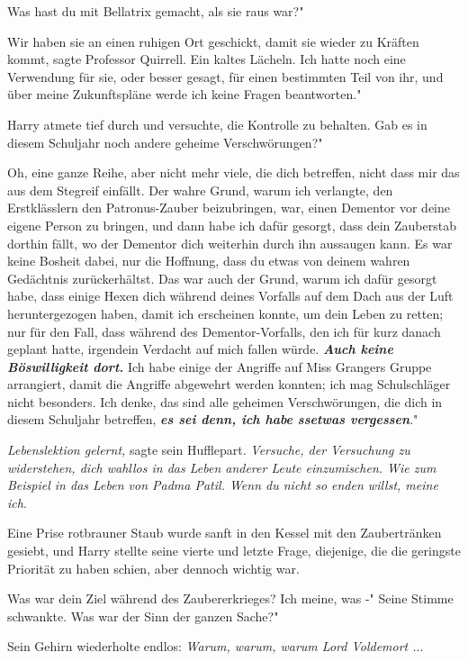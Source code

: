 \glqq Was hast du mit Bellatrix gemacht, als sie raus war?"

\glqq Wir haben sie an einen ruhigen Ort geschickt, damit sie wieder zu Kräften
kommt\grqq{}, sagte Professor Quirrell. Ein kaltes Lächeln. \glqq Ich hatte noch
eine Verwendung für sie, oder besser gesagt, für einen bestimmten Teil von ihr,
und über meine Zukunftspläne werde ich keine Fragen beantworten."

Harry atmete tief durch und versuchte, die Kontrolle zu behalten. \glqq Gab es
in diesem Schuljahr noch andere geheime Verschwörungen?"

\glqq Oh, eine ganze Reihe, aber nicht mehr viele, die dich betreffen, nicht
dass mir das aus dem Stegreif einfällt. Der wahre Grund, warum ich verlangte,
den Erstklässlern den Patronus-Zauber beizubringen, war, einen Dementor vor
deine eigene Person zu bringen, und dann habe ich dafür gesorgt, dass dein
Zauberstab dorthin fällt, wo der Dementor dich weiterhin durch ihn aussaugen
kann. Es war keine Bosheit dabei, nur die Hoffnung, dass du etwas von deinem
wahren Gedächtnis zurückerhältst. Das war auch der Grund, warum ich dafür
gesorgt habe, dass einige Hexen dich während deines Vorfalls auf dem Dach aus
der Luft heruntergezogen haben, damit ich erscheinen konnte, um dein Leben zu
retten; nur für den Fall, dass während des Dementor-Vorfalls, den ich für kurz
danach geplant hatte, irgendein Verdacht auf mich fallen würde.
\textbf{\emph{Auch keine Böswilligkeit dort.}} Ich habe einige der Angriffe auf
Miss Grangers Gruppe arrangiert, damit die Angriffe abgewehrt werden konnten;
ich mag Schulschläger nicht besonders. Ich denke, das sind alle geheimen
Verschwörungen, die dich in diesem Schuljahr betreffen, \textbf{\emph{es sei
denn, ich habe ssetwas vergessen}}."

\emph{Lebenslektion gelernt, }sagte sein Hufflepart. \emph{Versuche, der
Versuchung zu widerstehen, dich wahllos in das Leben anderer Leute einzumischen.
Wie zum Beispiel in das Leben von Padma Patil. Wenn du nicht so enden willst,
meine ich}.

Eine Prise rotbrauner Staub wurde sanft in den Kessel mit den Zaubertränken
gesiebt, und Harry stellte seine vierte und letzte Frage, diejenige, die die
geringste Priorität zu haben schien, aber dennoch wichtig war.

\glqq Was war dein Ziel während des Zaubererkrieges? Ich meine, was -" Seine
Stimme schwankte. \glqq Was war der Sinn der ganzen Sache?"

Sein Gehirn wiederholte endlos: \emph{Warum, warum, warum Lord Voldemort .}..

